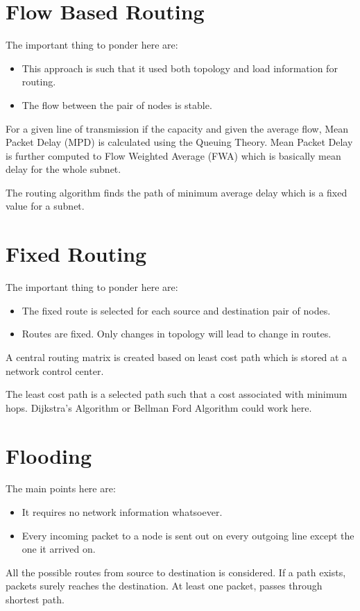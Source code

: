 \documentclass[12pt]{article}
\begin{document}
\section{Flow Based Routing}
The important thing to ponder here are:
\begin{itemize}
    \item This approach is such that it used both topology and load information for routing.
    \item The flow between the pair of nodes is stable.
\end{itemize}

For a given line of transmission if the capacity and given the average flow, Mean Packet Delay (MPD) is calculated using the Queuing Theory. Mean Packet Delay is further computed to Flow Weighted Average (FWA) which is basically mean delay for the whole subnet.

The routing algorithm finds the path of minimum average delay which is a fixed value for a subnet.

\section{Fixed Routing}
The important thing to ponder here are:
\begin{itemize}
    \item The fixed route is selected for each source and destination pair of nodes.
    \item Routes are fixed. Only changes in topology will lead to change in routes.
\end{itemize}
A central routing matrix is created based on least cost path which is stored at a network control center.

The least cost path is a selected path such that a cost associated with minimum hops. Dijkstra's Algorithm or Bellman Ford Algorithm could work here.

\section{Flooding}
The main points here are:
\begin{itemize}
    \item It requires no network information whatsoever.
    \item Every incoming packet to a node is sent out on every outgoing line except the one it arrived on.
\end{itemize}
All the possible routes from source to destination is considered. If a path exists, packets surely reaches the destination. At least one packet, passes through shortest path.
\end{document}
